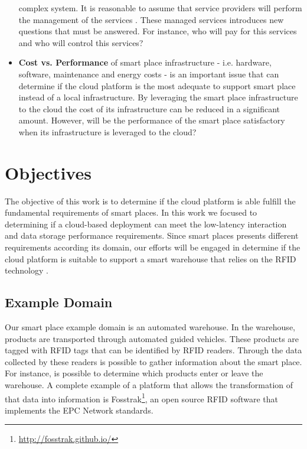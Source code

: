 \begin{itemize}
  complex system. It is reasonable to assume that service providers will perform the management of
  the services . These managed services introduces new questions that must be answered. For instance,
  who will pay for this services and who will control this services?
  \item \textbf{Cost vs. Performance} of smart place infrastructure - i.e. hardware, software,
  maintenance and energy costs - is an important issue that can determine if the cloud platform is the most
  adequate to support smart place instead of a local infrastructure. By leveraging the smart
  place infrastructure to the cloud the cost of its infrastructure can be reduced in a significant
  amount. However, will be the performance of the smart place satisfactory when its infrastructure is
  leveraged to the cloud?
\end{itemize}

\section{Objectives}
\label{section:objectives}
The objective of this work is to determine if the cloud platform is able fulfill the fundamental
requirements of smart places. In this work we focused to determining if a cloud-based
deployment can meet the low-latency interaction and data storage performance requirements. Since
smart places presents different requirements according its domain, our efforts will be engaged in
determine if the cloud platform is suitable to support a smart warehouse that relies on the RFID
technology \cite{want2006introduction}.\\

\subsection{Example Domain}
\label{sub:domain}
Our smart place example domain is an automated warehouse. In the warehouse, products are transported
through automated guided vehicles. These products are tagged with \gls{RFID} tags that can be identified
by \gls{RFID} readers.  Through the data collected by these readers is possible to gather information
about the smart place. For instance, is possible to determine which products enter or leave the
warehouse. A complete example of a platform that allows the transformation of that data into
information is Fosstrak\footnote{\url{http://fosstrak.github.io/}}, an open source \gls{RFID}
software that implements the \gls{EPC} Network standards.\\

